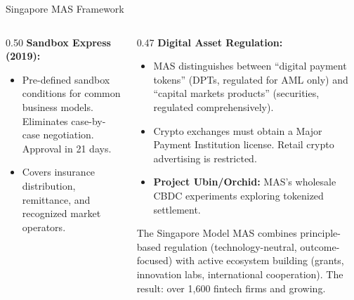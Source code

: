 \begin{frame}{Singapore MAS Framework}
\begin{columns}[T]
\begin{column}{0.50\textwidth}
      \vspace{0.3em}
      \textcolor{mlpurple}{\textbf{Sandbox Express (2019):}}
      \begin{itemize}
        \item Pre-defined sandbox conditions for common business models.
              Eliminates case-by-case negotiation. Approval in 21 days.
        \item Covers insurance distribution, remittance, and recognized
              market operators.
      \end{itemize}
    \end{column}
    \begin{column}{0.47\textwidth}
      \textcolor{mlpurple}{\textbf{Digital Asset Regulation:}}
      \begin{itemize}
        \item MAS distinguishes between ``digital payment tokens'' (DPTs,
              regulated for AML only) and ``capital markets products''
              (securities, regulated comprehensively).
        \item Crypto exchanges must obtain a Major Payment Institution
              license. Retail crypto advertising is restricted.
        \item \textbf{Project Ubin/Orchid:} MAS's wholesale CBDC experiments
              exploring tokenized settlement.
      \end{itemize}

      \vspace{0.3em}
      \begin{block}{The Singapore Model}
        MAS combines \textcolor{mlpurple}{principle-based regulation}
        (technology-neutral, outcome-focused) with
        \textcolor{mlpurple}{active ecosystem building} (grants, innovation
        labs, international cooperation). The result: over 1,600 fintech
        firms and growing.
      \end{block}
    \end{column}
  \end{columns}
\end{frame}


